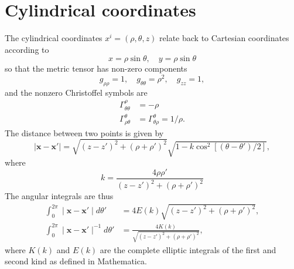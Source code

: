 \documentclass[reprint]{revtex4}
\begin{document}
\newpage
\appendix




\section{Cylindrical coordinates}
The cylindrical coordinates $x^i=(\rho,\theta,z)$ relate back to Cartesian coordinates according to
\begin{equation}
x=\rho\sin\theta, \quad y=\rho\sin\theta
\end{equation}
so that the metric tensor has non-zero components
\begin{equation}
g_{\rho\rho}=1,\quad g_{\theta\theta}=\rho^2,\quad g_{zz}=1,
\end{equation}
and the nonzero Christoffel symbols are
\begin{align}
\Gamma^{\rho}_{\theta\theta}&=-\rho\\
\Gamma^{\theta}_{\rho\theta}&=\Gamma^{\theta}_{\theta\rho}=1/\rho.
\end{align}
The distance between two points is given by
\begin{equation}
\mid \bm{x}-\bm{x}'\mid=\sqrt{(z-z')^2+(\rho+\rho')^2}\sqrt{1-k\cos^2[(\theta-\theta')/2]},
\end{equation}
where
\begin{equation}
k=\frac{4\rho\rho'}{(z-z')^2+(\rho+\rho')^2}
\end{equation}
The angular integrals are thus
\begin{align}
\int_0^{2\pi}\mid \bm{x}-\bm{x}'\mid d\theta'&=4E(k)\sqrt{(z-z')^2+(\rho+\rho')^2},\\
\int_0^{2\pi}\mid \bm{x}-\bm{x}'\mid^{-1} d\theta'&=\frac{4K(k)}{\sqrt{(z-z')^2+(\rho+\rho')^2}},
\end{align}
where $K(k)$ and $E(k)$ are the complete elliptic integrals of the first and second kind as defined in Mathematica.
\end{document}
